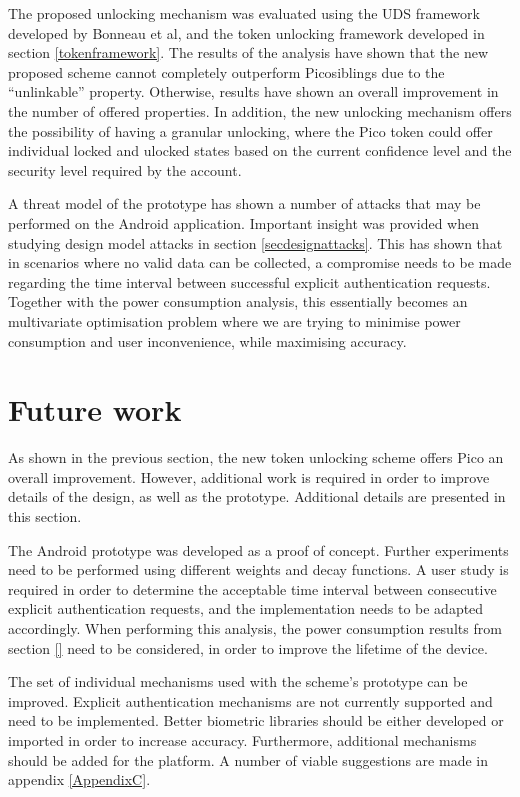 The proposed unlocking mechanism was evaluated using the UDS framework developed by Bonneau et al, and the token unlocking framework developed in section \ref{tokenframework}. The results of the analysis have shown that the new proposed scheme cannot completely outperform Picosiblings due to the ``unlinkable'' property. Otherwise, results have shown an overall improvement in the number of offered properties. In addition, the new unlocking mechanism offers the possibility of having a granular unlocking, where the Pico token could offer individual locked and ulocked states based on the current confidence level and the security level required by the account.

A threat model of the prototype has shown a number of attacks that may be performed on the Android application. Important insight was provided when studying design model attacks in section \ref{secdesignattacks}. This has shown that in scenarios where no valid data can be collected, a compromise needs to be made regarding the time interval between successful explicit authentication requests. Together with the power consumption analysis, this essentially becomes an multivariate optimisation problem where we are trying to minimise power consumption and user inconvenience, while maximising accuracy.

\section*{Future work}
As shown in the previous section, the new token unlocking scheme offers Pico an overall improvement. However, additional work is required in order to improve details of the design, as well as the prototype. Additional details are presented in this section. 

The Android prototype was developed as a proof of concept. Further experiments need to be performed using different weights and decay functions. A user study is required in order to determine the acceptable time interval between consecutive explicit authentication requests, and the implementation needs to be adapted accordingly. When performing this analysis, the power consumption results from section \ref{} need to be considered, in order to improve the lifetime of the device.

The set of individual mechanisms used with the scheme's prototype can be improved. Explicit authentication mechanisms are not currently supported and need to be implemented. Better biometric libraries should be either developed or imported in order to increase accuracy. Furthermore, additional mechanisms should be added for the platform. A number of viable suggestions are made in appendix \ref{AppendixC}.

